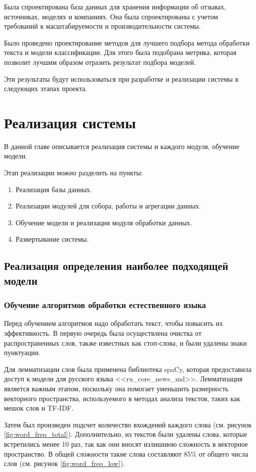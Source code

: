 \documentclass[PI, VKR]{HSEUniversity}
\begin{document}
Была спроектирована база данных для хранения информации об отзывах, источниках, моделях и компаниях. Она была спроектированы с учетом требований к масштабируемости и производительности системы.

Было проведено проектирование методов для лучшего подбора метода обработки текста и модели классификации. Для этого была подобрана метрика, которая позволит лучшим образом отразить результат подбора моделей.

Эти результаты будут использоваться при разработке и реализации системы в следующих этапах проекта.
\chapter{Реализация системы}
\label{sec:org9c179b0}
В данной главе описывается реализация системы и каждого модуля, обучение модели.

Этап реализации можно разделить на пункты:
\begin{enumerate}
\item Реализация базы данных.
\item Реализации модулей для собора, работы и агрегации данных.
\item Обучение модели и реализация модуля обработки данных.
\item Развертывание системы.
\end{enumerate}
\section{Реализация определения наиболее подходящей модели}
\label{sec:orge55ca62}
\subsection{Обучение алгоритмов обработки естественного языка}
\label{sec:orgbc6fdd0}
Перед обучением алгоритмов надо обработать текст, чтобы повысить их эффективность. В первую очередь была осуществлена очистка от распространенных слов, также известных как стоп-слова, и были удалены знаки пунктуации.

Для лемматизации слов была применена библиотека spaCy\autocite{boyd_explosion_2023}, которая предоставила доступ к модели для русского языка {}<<ru\_core\_news\_md>>{}. Лемматизация является важным этапом, поскольку она помогает уменьшить размерность векторного пространства, используемого в методах анализа текстов, таких как мешок слов и TF-IDF.

Затем был произведен подсчет количество вхождений каждого слова (см. рисунок \ref{fig:word_freq_total}). Дополнительно, из текстов были удалены слова, которые встретились менее 10 раз, так как они вносят излишнюю сложность в векторное пространство. В общей сложности такие слова составляют 85\% от общего числа слов (см. рисунок \ref{fig:word_freq_low}).
\end{document}
